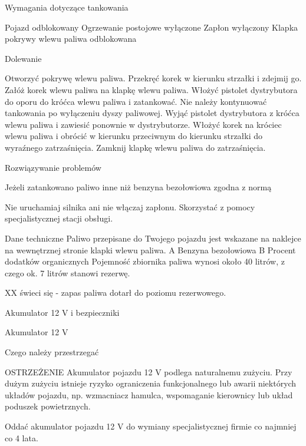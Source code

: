 Wymagania dotyczące tankowania
\begin{itemizeTick}
	\itemTick Pojazd odblokowany
	\itemTick Ogrzewanie postojowe wyłączone
	\itemTick Zapłon wyłączony
	\itemTick Klapka pokrywy wlewu paliwa odblokowana
\end{itemizeTick}

Dolewanie
\begin{itemizeArrow}
	\itemArrow Otworzyć pokrywę wlewu paliwa.
	\itemArrow Przekręć korek w kierunku strzałki i zdejmij go.
	\itemArrow Załóż korek wlewu paliwa na klapkę wlewu paliwa.
	\itemArrow Włożyć pistolet dystrybutora do oporu do króćca wlewu paliwa i zatankować.
	\itemArrow Nie należy kontynuować tankowania po wyłączeniu dyszy paliwowej.
	\itemArrow Wyjąć pistolet dystrybutora z króćca wlewu paliwa i zawiesić ponownie w dystrybutorze.
	\itemArrow Włożyć korek na króciec wlewu paliwa i obrócić w kierunku przeciwnym do kierunku strzałki do wyraźnego zatrzaśnięcia.
	\itemArrow Zamknij klapkę wlewu paliwa do zatrzaśnięcia.
\end{itemizeArrow}

Rozwiązywanie problemów

Jeżeli zatankowano paliwo inne niż benzyna bezołowiowa zgodna z normą
\begin{itemizeArrow}
	\itemArrow Nie uruchamiaj silnika ani nie włączaj zapłonu.
	\itemArrow Skorzystać z pomocy specjalistycznej stacji obsługi.
\end{itemizeArrow}

Dane techniczne
Paliwo przepisane do Twojego pojazdu jest wskazane na naklejce na wewnętrznej stronie klapki wlewu paliwa.
A Benzyna bezołowiowa
B Procent dodatków organicznych
Pojemność zbiornika paliwa wynosi około 40 litrów, z czego ok. 7 litrów stanowi rezerwę.

XX świeci się - zapas paliwa dotarł do poziomu rezerwowego.

Akumulator 12 V i bezpieczniki

Akumulator 12 V

Czego należy przestrzegać

OSTRZEŻENIE
Akumulator pojazdu 12 V podlega naturalnemu zużyciu. Przy dużym zużyciu istnieje ryzyko ograniczenia funkcjonalnego lub awarii niektórych układów pojazdu, np. wzmacniacz hamulca, wspomaganie kierownicy lub układ poduszek powietrznych.

\begin{itemizeTriangle}
	\itemTriangle Oddać akumulator pojazdu 12 V do wymiany specjalistycznej firmie co najmniej co 4 lata.
\end{itemizeTriangle}

